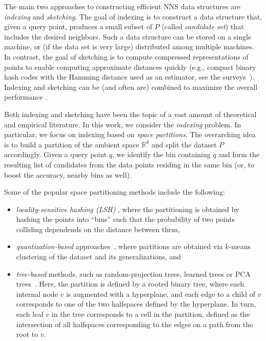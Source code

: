 \documentclass[11pt]{article}
\begin{document}
The main two approaches to constructing efficient NNS data structures are \emph{indexing} and \emph{sketching}. The goal of indexing is to construct a data structure that, given a query point, produces a small subset of $P$ (called  \emph{candidate set}) that includes the desired neighbors. Such a data structure can be stored on a single machine,  or (if the data set is very large) distributed among  multiple machines. In contrast, the goal of sketching is to compute compressed representations  of points to enable computing approximate distances quickly (e.g., compact binary hash codes with the Hamming distance used as an estimator, see the surveys~\cite{wang2014hashing,wang2016learning}). 
Indexing and sketching can be (and often are) combined to maximize the overall performance \cite{wu2017multiscale,johnson2017billion}.

Both indexing and sketching have been the topic of a vast amount of theoretical and empirical literature.
In this work, we consider the \emph{indexing} problem. In particular, we focus on indexing  based on \emph{space partitions}.
The overarching idea is to build a partition of the ambient space $\mathbb{R}^d$ and split the dataset $P$ accordingly.
Given a query point  $q$, we identify the bin containing $q$ and
form the resulting list of candidates from the data points residing in the same bin (or, to boost the accuracy, nearby bins as well).

Some of the popular space partitioning methods include the following:

\begin{itemize}
    \item {\em locality-sensitive hashing (LSH)} \cite{indyk1998approximate, andoni2008near,lv2007multi,andoni2015practical}, where the partitioning is obtained by hashing the points into ``bins'' such that the probability of two points colliding dependends on the distance between them,
    \item {\em quantization-based} approaches~\cite{jegou2011product,babenko2012inverted,avq_2020},
where partitions are obtained via $k$-means clustering of the dataset and its generalizations, and
    \item {\em tree-based} methods, such as  random-projection trees, learned trees or PCA trees~\cite{sproull1991refinements,bawa2005lsh,cayton2008learning, li2011learning,dasgupta2013randomized, keivani2018improved}. Here, the partition is defined by a rooted binary tree, where each internal node $v$ is augmented with a hyperplane, and each edge to a child of $v$ corresponds to one of the two halfspaces defined by the hyperplane.  In turn, each leaf $v$ in the tree corresponds to a cell in the partition, defined as the intersection of all halfspaces corresponding to the edges on a path from the root to $v$.
\end{itemize}
\end{document}
